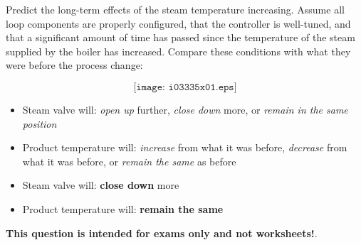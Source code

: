 

Predict the long-term effects of the steam temperature increasing.  Assume all loop components are properly configured, that the controller is well-tuned, and that a significant amount of time has passed since the temperature of the steam supplied by the boiler has increased.  Compare these conditions with what they were before the process change:

$$\texttt{[image: i03335x01.eps]}$$

\begin{itemize}
\item{} Steam valve will: {\it open up} further, {\it close down} more, or {\it remain in the same position} 
\vskip 10pt
\item{} Product temperature will: {\it increase} from what it was before, {\it decrease} from what it was before, or {\it remain the same} as before
\end{itemize}







\begin{itemize}
\item{} Steam valve will: {\bf close down} more 
\vskip 5pt
\item{} Product temperature will: {\bf remain the same}
\end{itemize}







{\bf This question is intended for exams only and not worksheets!}.




